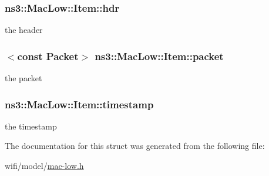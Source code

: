 \subsubsection[{\texorpdfstring{hdr}{hdr}}]{ ns3\+::\+Mac\+Low\+::\+Item\+::hdr}\hypertarget{structns3_1_1MacLow_1_1Item_a77cca1745aa1495568494a5b5df62170}{}\label{structns3_1_1MacLow_1_1Item_a77cca1745aa1495568494a5b5df62170}


the header 

\subsubsection[{\texorpdfstring{packet}{packet}}]{$<$const {\bf Packet}$>$ ns3\+::\+Mac\+Low\+::\+Item\+::packet}\hypertarget{structns3_1_1MacLow_1_1Item_a0176929020a1820fb54c53ac54f75b77}{}\label{structns3_1_1MacLow_1_1Item_a0176929020a1820fb54c53ac54f75b77}


the packet 

\subsubsection[{\texorpdfstring{timestamp}{timestamp}}]{ ns3\+::\+Mac\+Low\+::\+Item\+::timestamp}\hypertarget{structns3_1_1MacLow_1_1Item_ab00a7d13691ec070b48a1821f71d368f}{}\label{structns3_1_1MacLow_1_1Item_ab00a7d13691ec070b48a1821f71d368f}


the timestamp 



The documentation for this struct was generated from the following file\+:\begin{DoxyCompactItemize}
\item 
wifi/model/\hyperlink{mac-low_8h}{mac-\/low.\+h}\end{DoxyCompactItemize}
